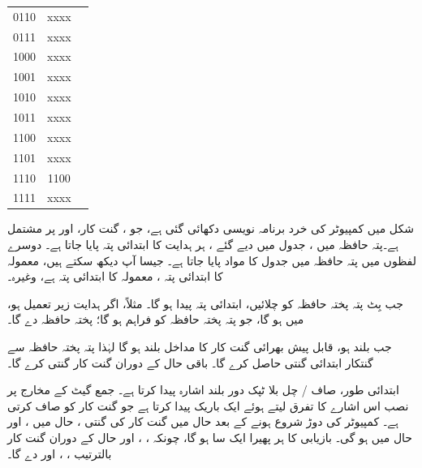 \begin{table}
\begin{minipage}{0.35\textwidth}
\begin{tabular}{CCR}
0110&xxxx&\\
0111&xxxx&\\
1000&xxxx&\\
1001&xxxx&\\
1010&xxxx&\\
1011&xxxx&\\
1100&xxxx&\\
1101&xxxx&\\
1110&1100&\\
1111&xxxx&\\
\bottomrule
\end{tabular}
\end{minipage}
\end{table}

شکل  میں کمپیوٹر  کی خرد  برنامہ  نویسی دکھائی گئی ہے، جو   ،  گنت کار، اور  پر مشتمل ہے۔پتہ حافظہ میں ، جدول      میں دیے گئے ، ہر  ہدایت کا  ابتدائی پتہ  پایا جاتا ہے۔ دوسرے لفظوں میں  پتہ حافظہ میں جدول  کا مواد پایا جاتا ہے۔ جیسا آپ دیکھ سکتے ہیں،  معمولہ کا ابتدائی پتہ  ،  معمولہ کا  ابتدائی پتہ  ہے، وغیرہ۔

جب بِٹ     پتہ پختہ حافظہ   کو چلائیں،  ابتدائی پتہ پیدا ہو گا۔ مثلاً، اگر  ہدایت زیر تعمیل ہو،  میں  ہو گا، جو  پتہ پختہ حافظہ کو  فراہم  ہو گا؛ پختہ حافظہ  دے گا۔

جب  بلند ہو، قابل پیش بھرائی گنت کار کا مداخل بلند ہو گا لہٰذا  پتہ پختہ حافظہ سے گنتکار   ابتدائی  گنتی    حاصل کرے گا۔ باقی  حال کے دوران گنت کار گنتی کرے گا۔

ابتدائی طور، صاف /  چل  بلا ٹپک دور  بلند  اشارہ پیدا کرتا ہے۔ جمع گیٹ کے مخارج پر نصب  اس اشارے کا تفرق لیتے ہوئے ایک باریک پیدا کرتا ہے جو گنت کار کو صاف کرتی ہے۔ کمپیوٹر کی دوڑ   شروع ہونے  کے بعد  حال میں گنت کار کی گنتی ،  حال میں ، اور  حال میں  ہو گی۔ بازیابی  کا ہر پھیرا  ایک سا ہو گا، چونکہ ، ، اور  حال کے دوران گنت کار  بالترتیب ، ، اور  دے گا۔


